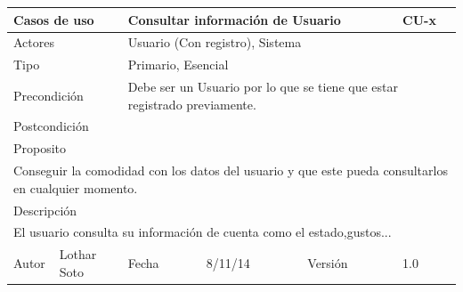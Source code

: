 \documentclass{article}
\begin{document}
\begin{table}[h]
\begin{tabular}{|l|l|l|l|l|l|}
\hline
\multicolumn{2}{|p{2cm}|}{Casos de uso}  & \multicolumn{3}{p{7cm}|}{\textbf{Consultar información de Usuario}} & CU-x \\
\hline
\multicolumn{2}{|p{2cm}|}{Actores}       & \multicolumn{4}{p{8cm}|}{Usuario (Con registro), Sistema}        \\
\hline
\multicolumn{2}{|p{2cm}|}{Tipo}          & \multicolumn{4}{p{8cm}|}{Primario, Esencial}        \\
\hline
\multicolumn{2}{|p{2cm}|}{Precondición}  & \multicolumn{4}{p{8cm}|}{Debe ser un Usuario por lo que se tiene que estar registrado previamente.}        \\
\hline
\multicolumn{2}{|p{2cm}|}{Postcondición} & \multicolumn{4}{p{8cm}|}{}        \\
\hline
\multicolumn{6}{|p{10cm}|}{Proposito}                                   \\
\hline
\multicolumn{6}{|p{10cm}|}{Conseguir la comodidad con los datos del usuario y que este pueda consultarlos en cualquier momento.}                                            \\
\hline
\multicolumn{6}{|p{10cm}|}{Descripción}                                 \\
\hline
\multicolumn{6}{|p{10cm}|}{El usuario consulta su información de cuenta como el estado,gustos...}                                            \\
\hline
Autor              &     Lothar Soto         & Fecha    &  8/11/14   &   Versión  & 1.0\\     
\hline
\end{tabular}
\end{table}
\end{document}
